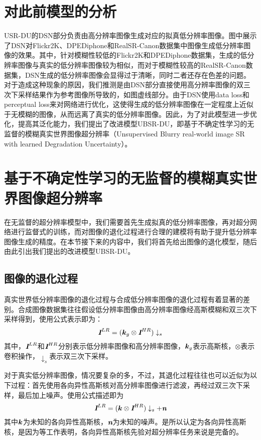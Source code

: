 \section{对此前模型的分析}
USR-DU的DSN部分负责由高分辨率图像生成对应的拟真低分辨率图像。图中展示了DSN对Flickr2K\parencite{timofte2017ntire}、DPEDiphone\parencite{ignatov2017dslr}和RealSR-Canon数据集中图像生成低分辨率图像的效果。其中，针对模糊性较低的Flickr2K和DPEDiphone数据集，生成的低分辨率图像与真实的低分辨率图像较为相似，而对于模糊性较高的RealSR-Canon数据集，DSN生成的低分辨率图像会显得过于清晰，同时二者还存在色差的问题。对于造成这种现象的原因，我们推测是由DSN部分直接使用高分辨率图像的双三次下采样结果作为参考图像所导致的，如图虚线部分。由于DSN使用data loss和perceptual loss来对网络进行优化，这使得生成的低分辨率图像在一定程度上近似于无模糊的图像，从而远离了真实的低分辨率图像。因此，为了对此模型进一步优化，提高其泛化能力，我们提出了改进模型UBSR-DU，即基于不确定性学习的无监督的模糊真实世界图像超分辨率（Unsupervised Blurry real-world image SR with learned Degradation Uncertainty）。
\section{基于不确定性学习的无监督的模糊真实世界图像超分辨率}
在无监督的超分辨率模型中，我们需要首先生成拟真的低分辨率图像，再对超分网络进行监督式的训练，而对图像的退化过程进行合理的建模将有助于提升低分辨率图像生成的精度。在本节接下来的内容中，我们将首先给出图像的退化模型，随后由此引出我们提出的改进模型UBSR-DU。
\subsection{图像的退化过程}
真实世界低分辨率图像的退化过程与合成低分辨率图像的退化过程有着显著的差别。合成图像数据集往往假设低分辨率图像由高分辨率图像经高斯模糊和双三次下采样得到，使用公式表示即为：
\begin{equation}
    \textbf{\em I}^{LR}=(\vb*{k}_g\otimes \textbf{\em I}^{HR})\downarrow_s
\end{equation}
其中，$\textbf{\em I}^{LR}$和$\textbf{\em I}^{HR}$分别表示低分辨率图像和高分辨率图像，$\vb*{k}_g$表示高斯核，$\otimes$表示卷积操作，$\downarrow_s$表示双三次下采样。

对于真实低分辨率图像，情况要复杂的多，不过，其退化过程往往也可以近似为以下过程：首先使用各向异性高斯核对高分辨率图像进行滤波，再经过双三次下采样，最后加上噪声。使用公式描述即为
\begin{equation}
    \textbf{\em I}^{LR}=(\vb*{k}\otimes \textbf{\em I}^{HR})\downarrow_s+\textbf{\em n}
\end{equation}
其中$\vb*{k}$为未知的各向异性高斯核，$\textbf{\em n}$为未知的噪声。是所以认定为各向异性高斯核，是因为等工作表明，各向异性高斯核先验对超分辨率任务来说是完备的。

